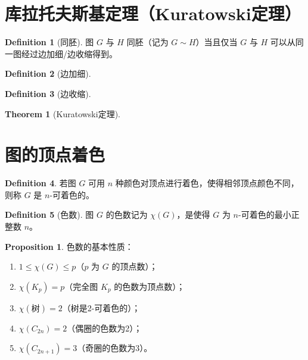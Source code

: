\documentclass[oneside]{book}
\theoremstyle{definition}
\newtheorem{proposition}{Proposition}[section]
\newtheorem{definition}{Definition}[section]
\newtheorem{theorem}{Theorem}[section]
\begin{document}
	\section{库拉托夫斯基定理（Kuratowski定理）}

\begin{definition}[同胚]
	图 \( G \) 与 \( H \) 同胚（记为 \( G \sim H \)）当且仅当 \( G \) 与 \( H \) 可以从同一图经过边加细/边收缩得到。
\end{definition}

\begin{definition}[边加细]

\end{definition}

\begin{definition}[边收缩]

\end{definition}

\begin{theorem}[Kuratowski定理]

\end{theorem}

\section{图的顶点着色}

\begin{definition}
	若图 \( G \) 可用 \( n \) 种颜色对顶点进行着色，使得相邻顶点颜色不同，则称 \( G \) 是 \( n \)-可着色的。
\end{definition}

\begin{definition}[色数]
	图 \( G \) 的色数记为 \( \chi(G) \)，是使得 \( G \) 为 \( n \)-可着色的最小正整数 \( n \)。
\end{definition}

\begin{proposition}
	色数的基本性质：
	\begin{enumerate}
		\item \( 1 \leq \chi(G) \leq p \)（\( p \) 为 \( G \) 的顶点数）；
		\item \( \chi(K_p) = p \)（完全图 \( K_p \) 的色数为顶点数）；
		\item \( \chi(\text{树}) = 2 \)（树是2-可着色的）；
		\item \( \chi(C_{2n}) = 2 \)（偶圈的色数为2）；
		\item \( \chi(C_{2n+1}) = 3 \)（奇圈的色数为3）。
	\end{enumerate}
\end{proposition}
\end{document}
